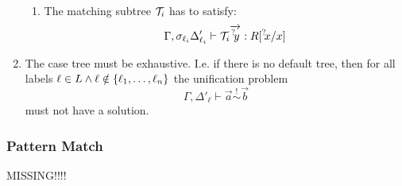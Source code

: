 \begin{enumerate}
\begin{enumerate}
            \item The matching subtree ${\mathcal T}_i$ has to satisfy:
                $$
                    \Gamma, \sigma_{\ell_i} \Delta'_{\ell_i}
                    \vdash
                    {\mathcal T}_i {\overrightarrow {{{}^? \kern-0.2em y}}}
                    :
                    R[{{}^? \kern-0.2em x} / x]
                $$

        \end{enumerate}


    \item The case tree must be exhaustive. I.e. if there is no default tree,
        then for all labels
        $
            \ell \in L
            \land
            \ell \notin {\{\ell_1, \ldots, \ell_n\}}
        $
        the unification problem
        $$
            \Gamma, \Delta'_\ell
            \vdash
            \vec a \stackrel ! \sim \vec b
        $$
        must not have a solution.
\end{enumerate}






\subsubsection{Pattern Match}


MISSING!!!!
